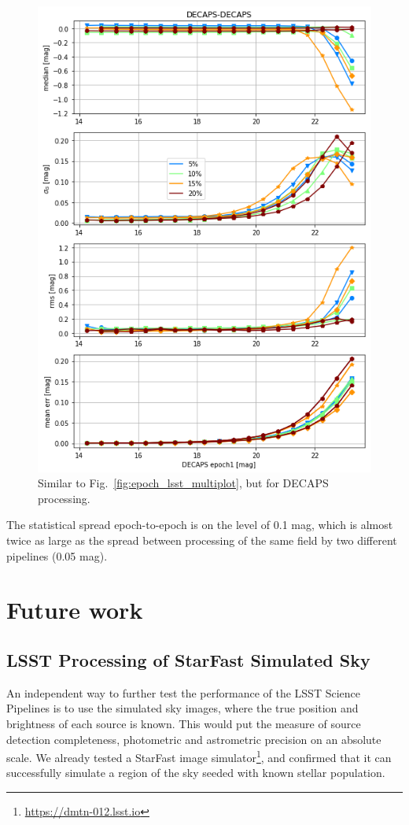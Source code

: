 \documentclass[DM,lsstdraft,toc,usenatbib]{lsstdoc}
\begin{document}
\begin{figure}
\begin{centering}
\includegraphics[width=0.8\columnwidth]{figs/21_decaps-decaps_spread_plot.png}
\caption{Similar to Fig.~\ref{fig:epoch_lsst_multiplot}, but for DECAPS processing. }
\label{fig:epoch_decaps_multiplot}
\end{centering}
\end{figure} 


The statistical spread epoch-to-epoch is on the level of 0.1 mag,  which is almost twice as large as the spread between processing of the same field by two different pipelines (0.05 mag). 


\section{Future work}
\label{sec:conclusions}

\subsection{LSST Processing of StarFast Simulated Sky}
An independent way to further test the performance of the LSST Science Pipelines is to use the simulated sky images, where the true position and  brightness of each source is known. This would put the measure of source detection completeness, photometric and astrometric precision on an absolute scale. We already tested a StarFast image simulator\footnote{\url{https://dmtn-012.lsst.io}}, and confirmed that it can successfully simulate a region of the sky seeded with known stellar population.  
\end{document}
